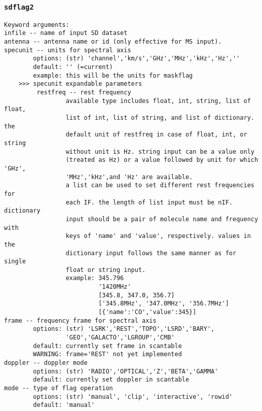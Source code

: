 \subsubsection{{\tt sdflag2}}
\label{section:sd.sdtasks.tasks.sdflag2}

\begin{verbatim}
Keyword arguments:
infile -- name of input SD dataset
antenna -- antenna name or id (only effective for MS input). 
specunit -- units for spectral axis
        options: (str) 'channel','km/s','GHz','MHz','kHz','Hz',''
        default: '' (=current)
        example: this will be the units for maskflag
    >>> specunit expandable parameters
         restfreq -- rest frequency
                 available type includes float, int, string, list of float, 
                 list of int, list of string, and list of dictionary. the 
                 default unit of restfreq in case of float, int, or string 
                 without unit is Hz. string input can be a value only 
                 (treated as Hz) or a value followed by unit for which 'GHz',
                 'MHz','kHz',and 'Hz' are available. 
                 a list can be used to set different rest frequencies for 
                 each IF. the length of list input must be nIF. dictionary 
                 input should be a pair of molecule name and frequency with 
                 keys of 'name' and 'value', respectively. values in the 
                 dictionary input follows the same manner as for single 
                 float or string input. 
                 example: 345.796
                          '1420MHz'
                          [345.8, 347.0, 356.7]
                          ['345.8MHz', '347.0MHz', '356.7MHz']
                          [{'name':'CO','value':345}]
frame -- frequency frame for spectral axis
        options: (str) 'LSRK','REST','TOPO','LSRD','BARY',
                 'GEO','GALACTO','LGROUP','CMB'
        default: currently set frame in scantable
        WARNING: frame='REST' not yet implemented
doppler -- doppler mode
        options: (str) 'RADIO','OPTICAL','Z','BETA','GAMMA'
        default: currently set doppler in scantable
mode -- type of flag operation
        options: (str) 'manual', 'clip', 'interactive', 'rowid'
        default: 'manual'


\end{verbatim}
